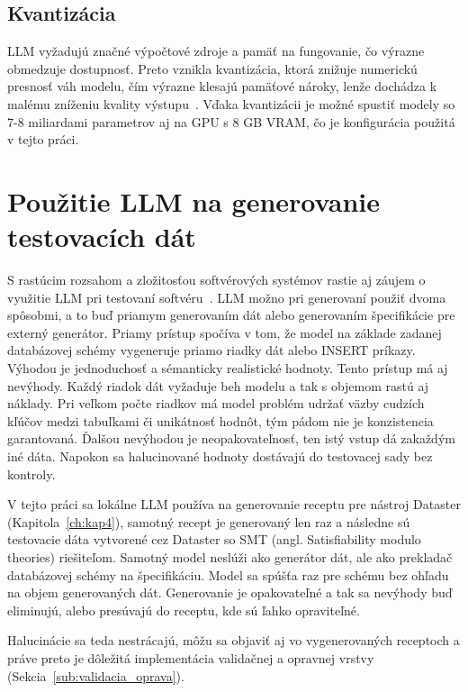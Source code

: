 \subsection{Kvantizácia}

LLM vyžadujú značné výpočtové zdroje a pamäť na fungovanie, čo výrazne obmedzuje dostupnosť. Preto vznikla kvantizácia, ktorá znižuje numerickú presnosť váh modelu, čím výrazne klesajú pamäťové nároky, lenže dochádza k malému zníženiu kvality výstupu~\cite{Naveed2024}. Vďaka kvantizácii je možné spustiť modely so 7-8 miliardami parametrov aj na GPU s 8 GB VRAM, čo je konfigurácia použitá v tejto práci.

\section{Použitie LLM na generovanie testovacích dát}
\label{sub:pouzitie_llm_na_generovanie_dat}

S rastúcim rozsahom a zložitosťou softvérových systémov rastie aj záujem o využitie LLM pri testovaní softvéru~\cite{Wang2024}. LLM možno pri generovaní použiť dvoma spôsobmi, a to buď priamym generovaním dát alebo generovaním špecifikácie pre externý generátor. Priamy prístup spočíva v tom, že model na základe zadanej databázovej schémy vygeneruje priamo riadky dát alebo INSERT príkazy. Výhodou je jednoduchosť a sémanticky realistické hodnoty. Tento prístup má aj nevýhody. Každý riadok dát vyžaduje beh modelu a tak s objemom rastú aj náklady. Pri veľkom počte riadkov má model problém udržať väzby cudzích kľúčov medzi tabuľkami či unikátnosť hodnôt, tým pádom nie je konzistencia garantovaná. Ďalšou nevýhodou je neopakovateľnosť, ten istý vstup dá zakaždým iné dáta. Napokon sa halucinované hodnoty dostávajú do testovacej sady bez kontroly. 


V tejto práci sa lokálne LLM používa na generovanie receptu pre nástroj Dataster (Kapitola~\ref{ch:kap4}), samotný recept je generovaný len raz a následne sú testovacie dáta vytvorené cez Dataster so SMT (angl. Satisfiability modulo theories) riešiteľom. Samotný model neslúži ako generátor dát, ale ako prekladač databázovej schémy na špecifikáciu. Model sa spúšťa raz pre schému bez ohľadu na objem generovaných dát. Generovanie je opakovateľné a tak sa nevýhody buď eliminujú, alebo presúvajú do receptu, kde sú ľahko opraviteľné.


Halucinácie sa teda nestrácajú, môžu sa objaviť aj vo vygenerovaných receptoch a práve preto je dôležitá implementácia validačnej a opravnej vrstvy (Sekcia~\ref{sub:validacia_oprava}).

